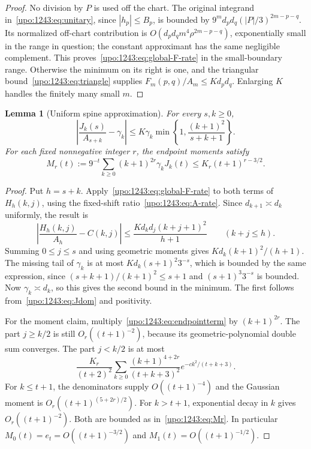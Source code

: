 \documentclass[11pt,letterpaper]{article}
\newtheorem{lemma}[theorem]{Lemma}
\theoremstyle{remark}\newtheorem{remark}[theorem]{Remark}
\numberwithin{equation}{section}
\begin{document}
\begin{proof}
No division by $P$ is used off the chart. The original integrand
in~\eqref{upo:1243:eq:unitary}, since $|h_p|\le B_p$, is bounded by
$9^m d_pd_q(|P|/3)^{2m-p-q}$. Its normalized off-chart contribution is
$O(d_pd_qm^4\rho^{2m-p-q})$, exponentially small in the range in question;
the constant approximant has the same negligible complement.
This proves~\eqref{upo:1243:eq:global-F-rate} in the small-boundary range.
Otherwise the minimum on its right is one, and the triangular
bound~\eqref{upo:1243:eq:triangle} supplies $F_m(p,q)/A_m\le Kd_pd_q$.
Enlarging $K$ handles the finitely many small $m$.
\end{proof}

\begin{lemma}[Uniform spine approximation]\label{upo:1243:lem:J-rate}
For every $s,k\ge0$,
\begin{equation}\label{upo:1243:eq:J-rate}
 \left|\frac{J_k(s)}{A_{s+k}}-\gamma_k\right|
 \le K\gamma_k\min\left\{1,\frac{(k+1)^2}{s+k+1}\right\}.
\end{equation}
For each fixed nonnegative integer $r$, the endpoint moments satisfy
\begin{equation}\label{upo:1243:eq:Mr}
 M_r(t):=9^{-t}\sum_{k\ge0}(k+1)^{2r}\gamma_kJ_k(t)
       \le K_r(t+1)^{r-3/2}.
\end{equation}
\end{lemma}
\begin{proof}
Put $h=s+k$. Apply~\eqref{upo:1243:eq:global-F-rate} to both terms of $H_h(k,j)$,
using the fixed-shift ratio~\eqref{upo:1243:eq:A-rate}. Since $d_{k+1}\asymp d_k$
uniformly, the result is
\[
 \left|\frac{H_h(k,j)}{A_h}-C(k,j)\right|
 \le\frac{Kd_kd_j(k+j+1)^2}{h+1}\qquad(k+j\le h).
\]
Summing $0\le j\le s$ and using geometric moments gives
$Kd_k(k+1)^2/(h+1)$. The missing tail of $\gamma_k$ is at most
$Kd_k(s+1)^2 3^{-s}$, which is bounded by the same expression, since
$(s+k+1)/(k+1)^2\le s+1$ and $(s+1)^3 3^{-s}$ is bounded.
Now $\gamma_k\asymp d_k$, so this gives the second bound in the minimum.
The first follows from~\eqref{upo:1243:eq:Jdom} and positivity.

For the moment claim, multiply~\eqref{upo:1243:eq:endpointterm} by $(k+1)^{2r}$.
The part $j\ge k/2$ is still $O_r((t+1)^{-2})$, because its
geometric-polynomial double sum converges. The part $j<k/2$ is at most
\[
 \frac{K_r}{(t+2)^2}\sum_{k\ge0}
 \frac{(k+1)^{4+2r}}{(t+k+3)^2}
       e^{-ck^2/(t+k+3)}.
\]
For $k\le t+1$, the denominators supply $O((t+1)^{-4})$ and the
Gaussian moment is $O_r((t+1)^{(5+2r)/2})$. For $k>t+1$, exponential
decay in $k$ gives $O_r((t+1)^{-2})$. Both are bounded as
in~\eqref{upo:1243:eq:Mr}. In particular $M_0(t)=e_t=O((t+1)^{-3/2})$ and
$M_1(t)=O((t+1)^{-1/2})$.
\end{proof}
\end{document}
